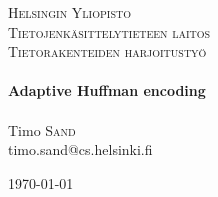 \begin{titlepage}

	
	\begin{center}
		\textsc{\LARGE Helsingin Yliopisto}\\[1.5cm]
		\textsc{\LARGE Tietojenkäsittelytieteen laitos}\\[1.0cm]
		\textsc{\Large Tietorakenteiden harjoitustyö}\\[0.5cm]
		
		\HRule \\[0.4cm]
		{ \huge \bfseries Adaptive Huffman encoding}\\[0.4cm]

		\HRule \\[1.5cm]
		
		Timo \textsc{Sand}\\
			timo.sand@cs.helsinki.fi

		
		\vfill
		
		{\large \today}
		
	\end{center}
	
\end{titlepage}